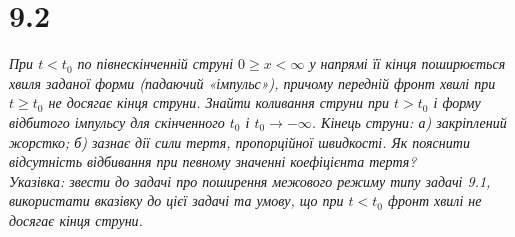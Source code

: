 


%


\section[Задача №9.2]{9.2}

\textit{При $t < t_0$ по півнескінченній струні $0 \geq x < \infty$ у напрямі її кінця поширюється хвиля заданої форми (падаючий «імпульс»), причому передній фронт хвилі при $t \geq t_0$ не досягає кінця струни. Знайти коливання струни при $t > t_0$ і форму відбитого імпульсу для скінченного $t_0$ і $t_0 \to -\infty$. Кінець струни: а) закріплений жорстко; б) зазнає дії сили тертя, пропорційної швидкості. Як пояснити відсутність відбивання при певному значенні коефіцієнта тертя?\\
Указівка: звести до задачі про поширення межового режиму типу задачі 9.1, використати вказівку до цієї задачі та умову, що при $t < t_0$ фронт хвилі не досягає кінця струни.}


%